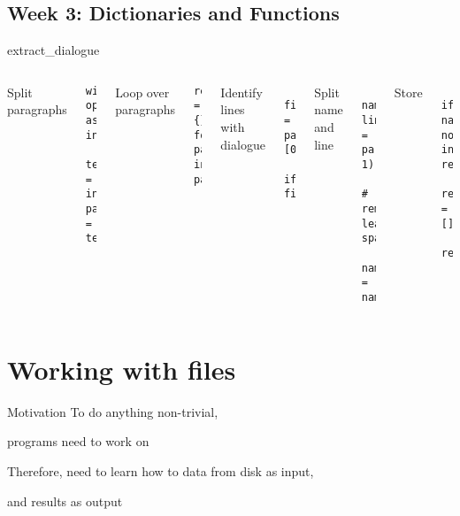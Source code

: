 \documentclass[aspectratio=169,usenames,dvipsnames]{beamer}
\begin{document}
\subsection{Week 3: Dictionaries and Functions}
\begin{frame}[fragile]{}
\end{frame}
\begin{frame}[fragile]{}
\end{frame}
\begin{frame}[fragile]{extract\_dialogue}
\begin{columns}
Split paragraphs
\begin{lstlisting}
with open(filename) as infile:
    text = infile.read()
paragraphs = text.split('\n\n')
\end{lstlisting}
\pause
Loop over paragraphs
\begin{lstlisting}
result = {}
for para in paragraphs:
\end{lstlisting}

\pause
Identify lines with dialogue
\begin{lstlisting}
    first_token = para.split()[0]
    if first_token.endswith('.'):
\end{lstlisting}
\pause Split name and line
\begin{lstlisting}
        name, line = para.split('.', 1)
        # remove leading/trailing spaces
        name = name.strip()
\end{lstlisting}
Store
\begin{lstlisting}
        if name not in result:
            result[name] = []
        result[name].append(line)
\end{lstlisting}
\end{columns}
\end{frame}





\section{Working with files}
\frame{\tableofcontents[currentsection]}

\begin{frame}{Motivation}
    To do anything non-trivial,

    programs need to work on 

    \pause
    Therefore, need to learn how to  data from disk as input,

    and  results as output

\end{frame}
\end{document}

